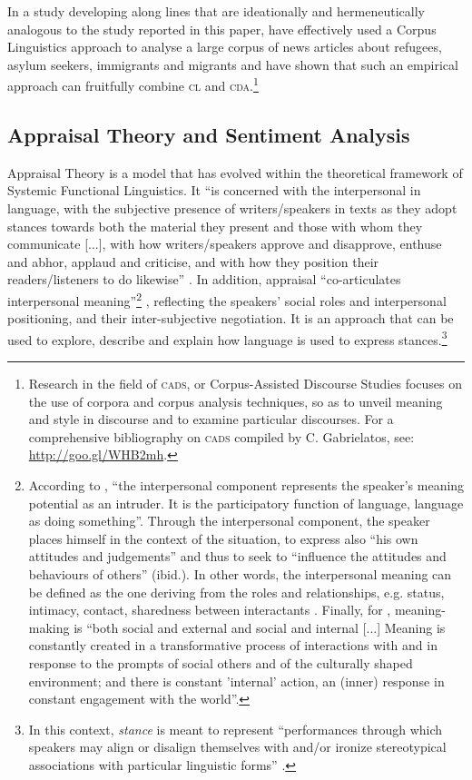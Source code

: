 \documentclass[output=paper]{LSP/langsci}
\begin{document}
In a study developing along lines that are ideationally and hermeneutically analogous to the study reported in this paper, \citet{BakerGabrielatos2008} have effectively used a Corpus Linguistics approach to analyse a large corpus of news articles about refugees, asylum seekers, immigrants and migrants and have shown that such an empirical approach can fruitfully combine \textsc{cl} and \textsc{cda}.\footnote{Research in the field of \textsc{cads}, or Corpus-Assisted Discourse Studies focuses on the use of corpora and corpus analysis techniques, so as to unveil meaning and style in discourse and to examine particular discourses. For a comprehensive bibliography on \textsc{cads} compiled by C. Gabrielatos, see: \url{http://goo.gl/WHB2mh}.}

\subsection{Appraisal Theory and Sentiment Analysis} \label{sec:2:2:3}
Appraisal Theory is a model that has evolved within the theoretical framework of Systemic Functional Linguistics. It “is concerned with the interpersonal in language, with the subjective presence of writers/speakers in texts as they adopt stances towards both the material they present and those with whom they communicate [...], with how writers/speakers approve and disapprove, enthuse and abhor, applaud and criticise, and with how they position their readers/listeners to do likewise” \citep[1]{MartinWhite2005}. In addition, appraisal “co-articulates interpersonal meaning”\footnote{According to \citet[112]{Halliday1978}, “the interpersonal component represents the speaker’s meaning potential as an intruder. It is the participatory function of language, language as doing something”. Through the interpersonal component, the speaker places himself in the context of the situation, to express also “his own attitudes and judgements” and thus to seek to “influence the attitudes and behaviours of others” (ibid.). In other words, the interpersonal meaning can be defined as the one deriving from the roles and relationships, e.g. status, intimacy, contact, sharedness between interactants \citep[49]{Eggins1997}. Finally, for \citet[94]{Kress2010}, meaning-making is “both social and external and social and internal [...] Meaning is constantly created in a transformative process of interactions with and in response to the prompts of social others and of the culturally shaped environment; and there is constant 'internal' action, an (inner) response in constant engagement with the world”.} \citep[33]{MartinWhite2005}, reflecting the speakers' social roles and interpersonal positioning, and their inter-subjective negotiation. It is an approach that can be used to explore, describe and explain how language is used to express stances.\footnote{In this context, \textit{stance} is meant to represent “performances through which speakers may align or disalign themselves with and/or ironize stereotypical associations with particular linguistic forms” \citep[4]{Jaffe2009}.}
\end{document}
